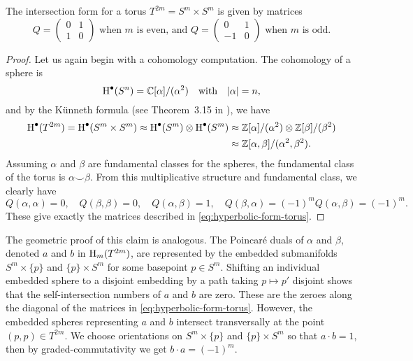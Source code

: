 \begin{figure}[ht]
	\centering
	\caption{}
\end{figure}

\begin{proposition}\label{prop:intersection-form-torus}
	The intersection form for a torus $T^{2m}=S^m\times S^m$ is given by matrices
	\begin{equation}\label{eq:hyperbolic-form-torus}
		Q = \begin{pmatrix}0 & 1 \\ 1 & 0\end{pmatrix}
		\textrm{ when }m\textrm{ is even, and }
		Q = \begin{pmatrix}0 & 1 \\ -1 & 0\end{pmatrix}
		\textrm{ when }m\textrm{ is odd.}
	\end{equation}
\end{proposition}
\begin{proof}
	Let us again begin with a cohomology computation. The cohomology of a sphere is
	\begin{equation}
		\operatorname{H}^\bullet(S^n) = \mathbb{C}[\alpha]/(\alpha^2)\quad\textrm{with}\quad |\alpha| = n,
	\end{equation}
	and by the K\"unneth formula (see Theorem~3.15 in \cite{hatcher2002topology}), we have
	\begin{equation}
		\begin{aligned}
			\operatorname{H}^\bullet(T^{2m})=\operatorname{H}^\bullet(S^m\times S^m)\approx \operatorname{H}^\bullet(S^m)\otimes \operatorname{H}^\bullet(S^m)
			 & \approx \mathbb{Z}[\alpha]/(\alpha^2)\otimes \mathbb{Z}[\beta]/(\beta^2) \\
			 & \approx \mathbb{Z}[\alpha,\beta]/(\alpha^2,\beta^2).
		\end{aligned}
	\end{equation}
	Assuming $\alpha$ and $\beta$ are fundamental classes for the spheres, the fundamental class of the torus is $\alpha\smile \beta$. From this multiplicative structure and fundamental class, we clearly have
	\begin{equation}
		Q(\alpha, \alpha)=0, \quad Q(\beta,\beta)=0, \quad Q(\alpha,\beta)=1,\quad Q(\beta,\alpha)=(-1)^m Q(\alpha,\beta)=(-1)^m.
	\end{equation}
	These give exactly the matrices described in \cref{eq:hyperbolic-form-torus}.
\end{proof}

The geometric proof of this claim is analogous. The Poincar\'e duals of $\alpha$ and $\beta$, denoted $a$ and $b$ in $\operatorname{H}_{m}(T^{2m})$, are represented
by the embedded submanifolds $S^m\times \{p\}$ and $\{p\}\times S^m$ for some basepoint $p\in S^m$. Shifting an individual embedded sphere to a disjoint embedding by a path taking $p\mapsto p'$ disjoint shows that the self-intersection numbers of $a$ and $b$ are zero. These are the zeroes along the diagonal of the matrices in \cref{eq:hyperbolic-form-torus}. However, the embedded spheres representing $a$ and $b$ intersect transversally at the point $(p,p)\in T^{2m}$. We choose orientations on $S^m\times \{p\}$ and $\{p\}\times S^m$ so that $a\cdot b=1$, then by graded-commutativity we get $b\cdot a=(-1)^m$.

